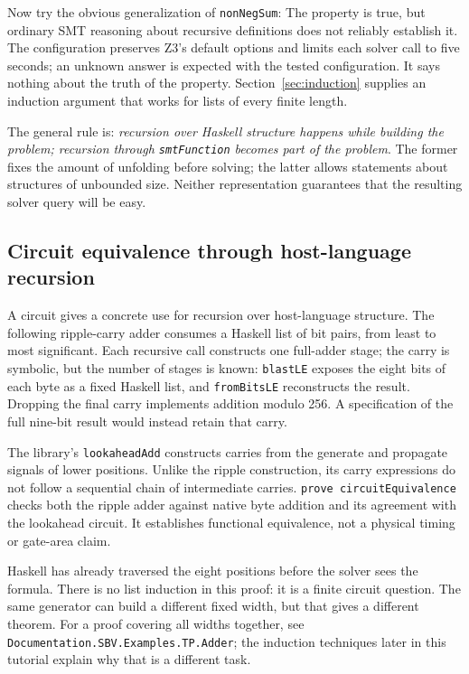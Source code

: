 \documentclass[review]{jfp-epi}
\newcommand{\code}[1]{\texttt{#1}}
\begin{document}
Now try the obvious generalization of \code{nonNegSum}:
The property is true, but ordinary SMT reasoning about recursive definitions
does not reliably establish it. The configuration preserves Z3's default options
and limits each solver call to five seconds; an unknown answer is expected
with the tested configuration.
It says nothing about the truth of the property. Section~\ref{sec:induction}
supplies an induction argument that works for lists of every finite length.

The general rule is: \emph{recursion over Haskell structure happens while building
the problem; recursion through \code{smtFunction} becomes part of the problem}.
The former fixes the amount of unfolding before solving; the latter allows
statements about structures of unbounded size. Neither representation guarantees
that the resulting solver query will be easy.


\subsection{Circuit equivalence through host-language recursion}
\label{sec:circuit-equivalence}

A circuit gives a concrete use for recursion over host-language structure.
The following ripple-carry adder consumes a Haskell list of bit pairs, from
least to most significant. Each recursive call constructs one full-adder stage;
the carry is symbolic, but the number of stages is known:
\code{blastLE} exposes the eight bits of each byte as a fixed Haskell list,
and \code{fromBitsLE} reconstructs the result. Dropping the final carry implements
addition modulo 256. A specification of the full nine-bit result would instead
retain that carry.

The library's \code{lookaheadAdd} constructs carries from the generate and
propagate signals of lower positions. Unlike the ripple construction, its
carry expressions do not follow a sequential chain of intermediate carries.
\code{prove circuitEquivalence} checks both the ripple adder against native
byte addition and its agreement with the lookahead circuit. It establishes
functional equivalence, not a physical timing or gate-area claim.

Haskell has already traversed the eight positions before the solver sees the
formula. There is no list induction in this proof: it is a finite circuit
question. The same generator can build a different fixed width, but that gives
a different theorem. For a proof covering all widths together, see
\code{Documentation.SBV.Examples.TP.Adder}; the induction techniques later in
this tutorial explain why that is a different task.
\end{document}
